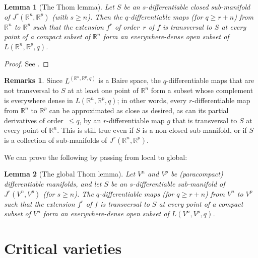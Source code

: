 \documentclass{article}
\theoremstyle{plain}
\newtheorem*{lemma*}{Lemma}
\theoremstyle{definition}
\newtheorem*{remarks*}{Remarks}
\newcommand{\RR}{\mathbb{R}}
\renewcommand{\geq}{\geqslant}
\renewcommand{\leq}{\leqslant}
\newcommand{\oldpage}[1]{\marginpar{\footnotesize$\Big\vert$ \textit{p.~#1}}}
\begin{document}
\begin{lemma*}[The Thom lemma]
  Let $S$ be an $s$-differentiable closed sub-manifold of $J^r(\RR^n,\RR^p)$ (with $s\geq n$).
  Then the $q$-differentiable maps (for $q\geq r+n$) from $\RR^n$
\oldpage{7-04}
  to $\RR^p$ such that the extension $f^r$ of order~$r$ of $f$ is transversal to $S$ at every point of a compact subset of $\RR^n$ form an everywhere-dense open subset of $L(\RR^n,\RR^p,q)$.
\end{lemma*}

\begin{proof}
  See \cite{3}.
\end{proof}

\begin{remarks*}
  Since $L^(\RR^n,\RR^p,q)$ is a Baire space, the $q$-differentiable maps that are not transversal to $S$ at at least one point of $\RR^n$ form a subset whose complement is everywhere dense in $L(\RR^n,\RR^p,q)$;
  in other words, every $r$-differentiable map from $\RR^n$ to $\RR^p$ can be approximated as close as desired, as can its partial derivatives of order~$\leq q$, by an $r$-differentiable map $g$ that is transversal to $S$ at every point of $\RR^n$.
  This is still true even if $S$ is a non-closed sub-manifold, or if $S$ is a collection of sub-manifolds of $J^r(\RR^n,\RR^p)$.
\end{remarks*}

We can prove the following by passing from local to global:

\begin{lemma*}[The global Thom lemma]
  Let $V^n$ and $V^p$ be (paracompact) differentiable manifolds, and let $S$ be an $s$-differentiable sub-manifold of $J^r(V^n,V^p)$ (for $s\geq n$).
  The $q$-differentiable maps (for $q\geq r+n$) from $V^n$ to $V^p$ such that the extension $f^r$ of $f$ is transversal to $S$ at every point of a compact subset of $V^n$ form an everywhere-dense open subset of $L(V^n,V^p,q)$.
\end{lemma*}


\section{Critical varieties}
\label{3}





\nocite{*}
\end{document}
